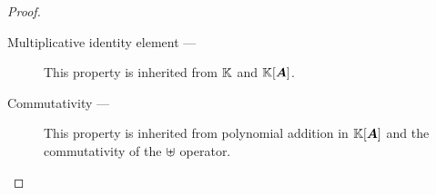 \begin{proposition}
\begin{proof}
\begin{description}


    \item[Multiplicative identity element --- ]

      This property is inherited from $\mathbb{K}$ and $\mathbb{K}[{\boldsymbol{A}}]$.

    \item[Commutativity --- ]

      This property is inherited from polynomial addition in $\mathbb{K}[{\boldsymbol{A}}]$
      and the commutativity of the $\uplus$ operator. 





\end{description}
\end{proof}
\end{proposition}
